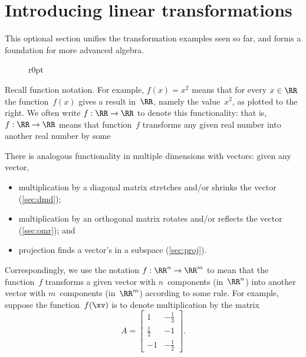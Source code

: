 

\section{Introducing linear transformations}
\label{sec:ilt}
\secttoc
\begin{comment}
\pooliv{\S3.6} \layiv{\S1.8--9} \holti{\S3.1}
\end{comment}


This optional section unifies the transformation examples seen so far, and forms a foundation for more advanced algebra. 

\begin{wrapfigure}r{0pt}
\end{wrapfigure}
Recall function notation.
For example, \(f(x)=x^2\) means that for every \(x\in\RR\) the function~\(f(x)\) gives a result in~\(\RR\), namely the value~\(x^2\), as plotted to the right.  
We often write \(f:\RR\to\RR\) to denote this functionality: that is, \(f:\RR\to\RR\) means that function~\(f\) transforms any given real number into another real number by some 

There is analogous functionality in multiple dimensions with vectors: given any vector, 
\begin{itemize}
\item multiplication by a diagonal matrix stretches and/or shrinks the vector (\cref{sec:dmd});
\item multiplication by an orthogonal matrix rotates and/or reflects the vector (\cref{sec:omr});
and \item projection finds a vector's  in a subspace (\cref{sec:proj}).
\end{itemize}
Correspondingly, we use the notation \(f:\RR^n\to\RR^m\) to mean that the function~\(f\) transforms a given vector with \(n\)~components (in~\(\RR^n\)) into another vector with \(m\)~components (in~\(\RR^m\)) according to some rule. 
For example, suppose the function~\(f(\xv)\) is to denote multiplication by the matrix
\begin{equation*}
A=\begin{bmatrix} 1&-\frac13\\\frac12&-1\\-1&-\frac12 \end{bmatrix}.
\end{equation*}

